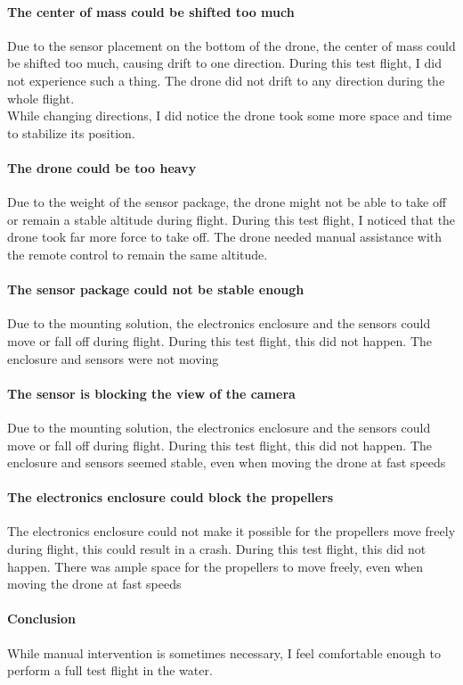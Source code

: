 \paragraph{The center of mass could be shifted too much}
Due to the sensor placement on the bottom of the drone, the center of mass could be shifted too much, causing drift to one direction. During this test flight, I did not experience such a thing. The drone did not drift to any direction during the whole flight.\\

While changing directions, I did notice the drone took some more space and time to stabilize its position.

\paragraph{The drone could be too heavy}
Due to the weight of the sensor package, the drone might not be able to take off or remain a stable altitude during flight. During this test flight, I noticed that the drone took far more force to take off. The drone needed manual assistance with the remote control to remain the same altitude.

\paragraph{The sensor package could not be stable enough}
Due to the mounting solution, the electronics enclosure and the sensors could move or fall off during flight. During this test flight, this did not happen. The enclosure and sensors were not moving

\paragraph{The sensor is blocking the view of the camera}
Due to the mounting solution, the electronics enclosure and the sensors could move or fall off during flight. During this test flight, this did not happen. The enclosure and sensors seemed stable, even when moving the drone at fast speeds

\paragraph{The electronics enclosure could block the propellers}
The electronics enclosure could not make it possible for the propellers move freely during flight, this could result in a crash. During this test flight, this did not happen. There was ample space for the propellers to move freely, even when moving the drone at fast speeds

\paragraph{Conclusion}
While manual intervention is sometimes necessary, I feel comfortable enough to perform a full test flight in the water.